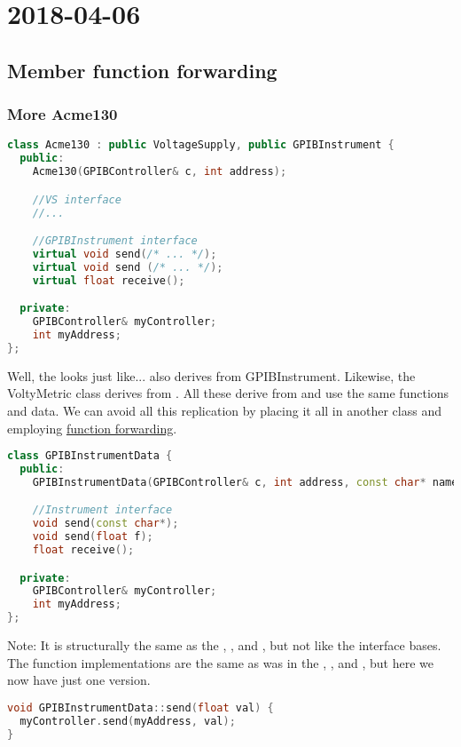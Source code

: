 \section{2018-04-06}

\subsection{Member function forwarding}

\subsubsection{More Acme130}

\begin{lstlisting}[language=C++]
class Acme130 : public VoltageSupply, public GPIBInstrument {
  public:
    Acme130(GPIBController& c, int address);

    //VS interface
    //...

    //GPIBInstrument interface
    virtual void send(/* ... */);
    virtual void send (/* ... */);
    virtual float receive();

  private:
    GPIBController& myController;
    int myAddress; 
};
\end{lstlisting}

Well, the  looks just like... also derives from GPIBInstrument. Likewise, the VoltyMetric class derives from . All these derive from  and use the same functions and data. We can avoid all this replication by placing it all in another class and employing \underline{function forwarding}. 


\begin{lstlisting}[language=C++]
class GPIBInstrumentData {
  public:
    GPIBInstrumentData(GPIBController& c, int address, const char* name);

    //Instrument interface
    void send(const char*);
    void send(float f);
    float receive();

  private:
    GPIBController& myController;
    int myAddress;
};
\end{lstlisting}

Note: It is structurally the same as the , , and , but not like the interface bases. The function implementations are the same as was in the , , and , but here we now have just one version. 

\begin{lstlisting}[language=C++]
void GPIBInstrumentData::send(float val) {
  myController.send(myAddress, val);
}
\end{lstlisting}

